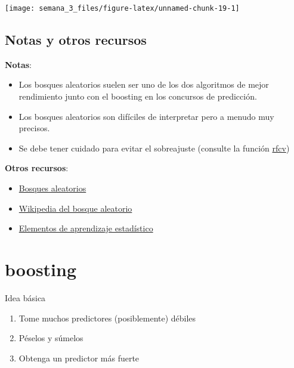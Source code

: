 \documentclass[
]{article}
\providecommand{\tightlist}{%
  \setlength{\itemsep}{0pt}\setlength{\parskip}{0pt}}
\begin{document}
\begin{center}\texttt{[image: semana\_3\_files/figure-latex/unnamed-chunk-19-1]} \end{center}

\hypertarget{notas-y-otros-recursos-1}{%
\subsection{Notas y otros recursos}\label{notas-y-otros-recursos-1}}

\textbf{Notas}:

\begin{itemize}
\tightlist
\item
  Los bosques aleatorios suelen ser uno de los dos algoritmos de mejor
  rendimiento junto con el boosting en los concursos de predicción.
\item
  Los bosques aleatorios son difíciles de interpretar pero a menudo muy
  precisos.
\item
  Se debe tener cuidado para evitar el sobreajuste (consulte la función
  \href{http://cran.r-project.org/web/packages/randomForest/randomForest.pdf}{rfcv})
\end{itemize}

\textbf{Otros recursos}:

\begin{itemize}
\tightlist
\item
  \href{http://www.stat.berkeley.edu/~breiman/RandomForests/cc_home.htm}{Bosques
  aleatorios}
\item
  \href{http://en.wikipedia.org/wiki/Random_forest}{Wikipedia del bosque
  aleatorio}
\item
  \href{http://www-stat.stanford.edu/~tibs/ElemStatLearn/}{Elementos de
  aprendizaje estadístico}
\end{itemize}

\hypertarget{boosting}{%
\section{boosting}\label{boosting}}

Idea básica

\begin{enumerate}
\def\labelenumi{\arabic{enumi}.}
\tightlist
\item
  Tome muchos predictores (posiblemente) débiles
\item
  Péselos y súmelos
\item
  Obtenga un predictor más fuerte
\end{enumerate}
\end{document}
